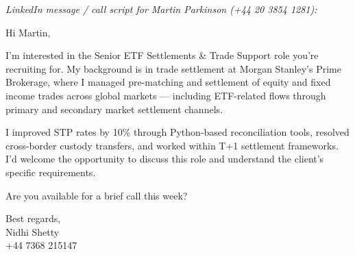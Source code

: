 \documentclass[11pt,a4paper]{article}
\begin{document}
\textit{LinkedIn message / call script for Martin Parkinson (+44 20 3854 1281):}

\vspace{6pt}

Hi Martin,

I'm interested in the Senior ETF Settlements \& Trade Support role you're recruiting for. My background is in trade settlement at Morgan Stanley's Prime Brokerage, where I managed pre-matching and settlement of equity and fixed income trades across global markets --- including ETF-related flows through primary and secondary market settlement channels.

I improved STP rates by 10\% through Python-based reconciliation tools, resolved cross-border custody transfers, and worked within T+1 settlement frameworks. I'd welcome the opportunity to discuss this role and understand the client's specific requirements.

Are you available for a brief call this week?

\vspace{8pt}
Best regards,\\
Nidhi Shetty\\
+44 7368 215147
\end{document}
